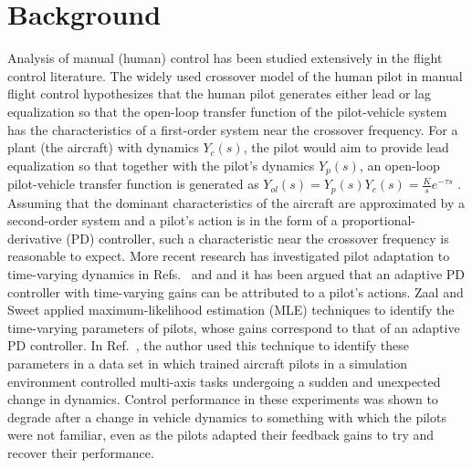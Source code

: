 \section{Background}
Analysis of manual (human) control \cite{hess2015modeling, zaal2016manual, mcruer1967review, mcruer1980human} has been studied extensively in the flight control literature. The widely used crossover model of the human pilot in manual flight control\cite{mcruer1967review} hypothesizes that the human pilot generates either lead or lag equalization so that the open-loop transfer function of the pilot-vehicle system has the characteristics of a first-order system near the crossover frequency. For a plant (the aircraft) with dynamics $Y_c(s)$, the pilot would aim to provide lead equalization so that together with the pilot's dynamics $Y_p(s)$, an open-loop pilot-vehicle transfer function is generated as $Y_{ol}(s)  = Y_p(s)Y_c(s) = \frac{K}{s} e^{-\tau s}$ \cite{mcruer1980human}. Assuming that the dominant characteristics of the aircraft are approximated by a second-order system and a pilot's action is in the form of a proportional-derivative (PD) controller, such a characteristic near the crossover frequency is reasonable to expect. More recent research has investigated pilot adaptation to time-varying dynamics in Refs.~\cite{hess2015modeling} and \cite{hess2009modeling} and it has been argued that an adaptive PD controller with time-varying gains can be attributed to a pilot's actions. Zaal and Sweet \cite{zaal2011estimation} applied maximum-likelihood estimation (MLE) techniques to identify the time-varying parameters of pilots, whose gains correspond to that of an adaptive PD controller. In  Ref.~\cite{zaal2016manual}, the author used this technique to identify these parameters in a data set in which trained aircraft pilots in a simulation environment controlled multi-axis tasks undergoing a sudden and unexpected change in dynamics. Control performance in these experiments was shown to degrade after a change in vehicle dynamics to something with which the pilots were not familiar, even as the pilots adapted their feedback gains to try and recover their performance.

